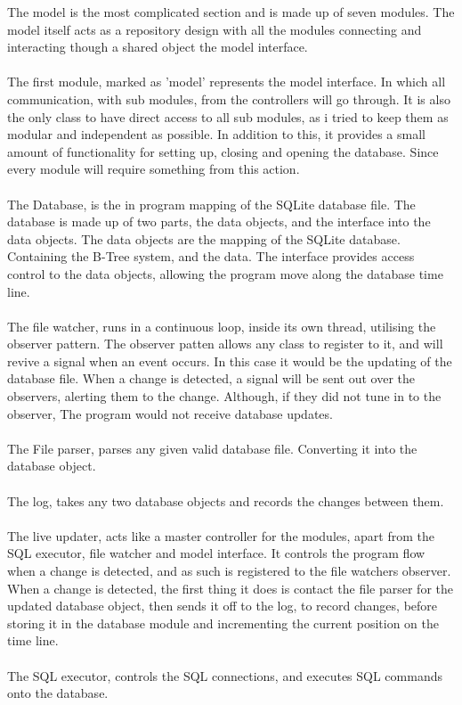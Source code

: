 The model is the most complicated section and is made up of seven modules. The model itself acts as a repository design with all the modules connecting and interacting though a shared object the model interface.
\\\\
The first module, marked as 'model' represents the model interface. In which all communication, with sub modules, from the controllers will go through. It is also the only class to have direct access to all sub modules, as i tried to keep them as modular and independent as possible. In addition to this, it provides a small amount of functionality for setting up, closing and opening the database. Since every module will require something from this action.
\\\\
The Database, is the in program mapping of the SQLite database file. The database is made up of two parts, the data objects, and the interface into the data objects. The data objects are the mapping of the SQLite database. Containing the B-Tree system, and the data. The interface provides access control to the data objects, allowing the program move along the database time line.
\\\\
The file watcher, runs in a continuous loop, inside its own thread, utilising the observer pattern. The observer patten allows any class to register to it, and will revive a signal when an event occurs. In this case it would be the updating of the database file. When a change is detected, a signal will be sent out over the observers, alerting them to the change. Although, if they did not tune in to the observer, The program would not receive  database updates.
\\\\
The File parser, parses any given valid database file. Converting it into the database object.
\\\\
The log, takes any two database objects and records the changes between them.
\\\\
The live updater, acts like a master controller for the modules, apart from the SQL executor, file watcher and model interface. It controls the program flow when a change is detected, and as such is registered to the file watchers observer. When a change is detected, the first thing it does is contact the file parser for the updated database object, then sends it off to the log, to record changes, before storing it in the database module and incrementing the current position on the time line.
\\\\
The SQL executor, controls the SQL connections, and executes SQL commands onto the database.

